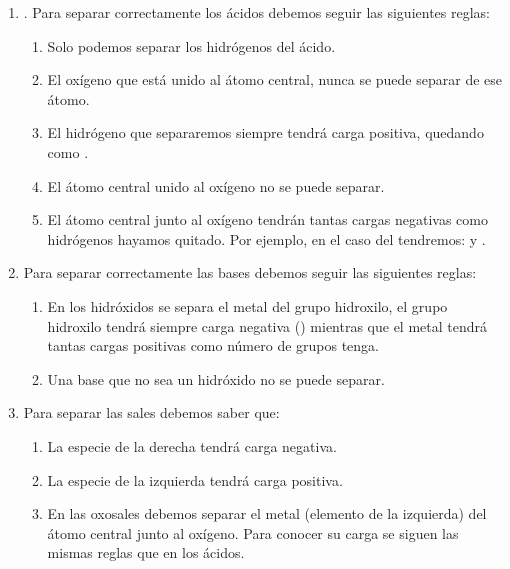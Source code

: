 \begin{enumerate}[label=\numberballmDarkTeal]
        \item {}.
        Para separar correctamente los ácidos debemos seguir las siguientes reglas:

        \begin{enumerate}[label=\letraminuscula]
            \item Solo podemos separar los hidrógenos del ácido.
            \item El oxígeno que está unido al átomo central, nunca se puede separar de ese átomo.
            \item El hidrógeno que separaremos siempre tendrá carga positiva, quedando como .
            \item El átomo central unido al oxígeno no se puede separar.
            \item El átomo central junto al oxígeno tendrán tantas cargas negativas como hidrógenos hayamos quitado.
            Por ejemplo, en el caso del  tendremos:  y .
        \end{enumerate}
        \item {}
        Para separar correctamente las bases debemos seguir las siguientes reglas:
        \begin{enumerate}[label=\letraminuscula]
            \item En los hidróxidos se separa el metal del grupo hidroxilo, el grupo hidroxilo tendrá siempre carga negativa () mientras que el metal tendrá tantas cargas positivas como número de grupos  tenga.
            \item Una base que no sea un hidróxido no se puede separar.
        \end{enumerate}
        \item {}
        Para separar las sales debemos saber que:
        \begin{enumerate}[label=\letraminuscula]
            \item La especie de la derecha tendrá carga negativa.
            \item La especie de la izquierda tendrá carga positiva.
            \item En las oxosales debemos separar el metal (elemento de la izquierda) del átomo central junto al oxígeno. Para conocer su carga se siguen las mismas reglas que en los ácidos.
        \end{enumerate}
\end{enumerate}

